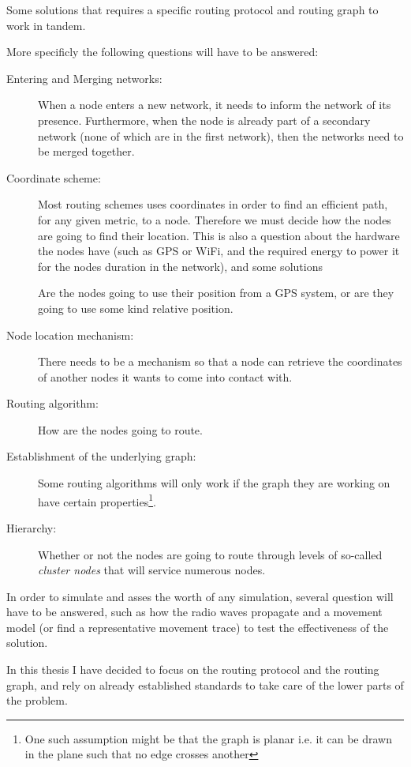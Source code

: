 Some solutions  that requires a specific routing protocol and routing graph to work in tandem.

More specificly the following questions will have to be answered:

\begin{description}
\item[Entering and Merging networks:] When a node enters a new network, it needs to inform the network of its presence. Furthermore, when the node is already part of a secondary network (none of which are in the first network), then the networks need to be merged together.  
\item[Coordinate scheme:] Most routing schemes uses coordinates in order to find an efficient path, for any given metric, to a node. Therefore we must decide how the nodes are going to find their location. This is also a question about the hardware the nodes have (such as GPS or WiFi, and the required energy to power it for the nodes duration in the network), and some solutions   

Are the nodes going to use their position from a GPS system, or are they going to use some kind relative position.
\item[Node location mechanism:] There needs to be a mechanism so that a node can retrieve the coordinates of another nodes it wants to come into contact with. 
\item[Routing algorithm:] How are the nodes going to route. 
\item[Establishment of the underlying graph:]  Some routing algorithms will only work if the graph they are working on have certain properties\footnote{One such assumption might be that the graph is planar i.e. it can be drawn in the plane such that no edge crosses another}.
\item[Hierarchy:] Whether or not the nodes are going to route through levels of so-called \emph{cluster nodes} that will service numerous nodes.
\end{description} 

In order to simulate and asses the worth of any simulation, several question will have to be answered, such as how the radio waves propagate and a movement model (or find a representative movement trace) to test the effectiveness of the solution. 

In this thesis I have decided to focus on the routing protocol and the routing graph, and rely on already established standards to take care of the lower parts of the problem.

